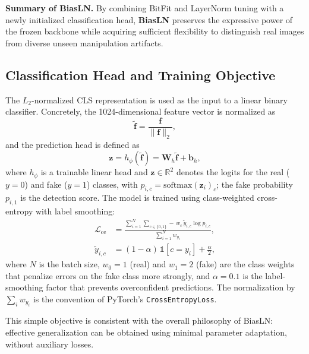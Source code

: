 \documentclass[fonts]{icst}
\newif\ifrevmark\revmarkfalse
\newcommand{\rev}[1]{\ifrevmark{\color{revblue}#1}\else#1\fi}
\begin{document}
\vspace{0.5em}
\noindent \textbf{Summary of BiasLN.}
By combining BitFit and LayerNorm tuning with a newly initialized classification head, \textbf{BiasLN} preserves the expressive power of the frozen backbone while acquiring sufficient flexibility to distinguish real images from diverse unseen manipulation artifacts.

\subsection{Classification Head and Training Objective}

The $L_2$-normalized CLS representation is used as the input to a linear binary classifier.
Concretely, the 1024-dimensional feature vector is normalized as
\begin{equation}
\tilde{\mathbf{f}} = \frac{\mathbf{f}}{\lVert \mathbf{f} \rVert_2},
\end{equation}
and the prediction head is defined as
\begin{equation}
\rev{\mathbf{z} = h_{\phi}(\tilde{\mathbf{f}}) = \mathbf{W}_h\tilde{\mathbf{f}}+\mathbf{b}_h,}
\end{equation}
where $h_{\phi}$ is a trainable linear head and \rev{$\mathbf{z} \in \mathbb{R}^2$ denotes the logits for the real ($y=0$) and fake ($y=1$) classes, with $p_{i,c}=\mathrm{softmax}(\mathbf{z}_i)_c$; the fake probability $p_{i,1}$ is the detection score.}
The model is trained using class-weighted cross-entropy with label smoothing:
\begin{equation}
\rev{\begin{aligned}
\mathcal{L}_{\mathrm{ce}}&=\frac{\sum_{i=1}^{N}\sum_{c\in\{0,1\}}-\,w_c\,\tilde{y}_{i,c}\log p_{i,c}}{\sum_{i=1}^{N}w_{y_i}},\\
\tilde{y}_{i,c}&=(1-\alpha)\,\mathbb{1}[c=y_i]+\tfrac{\alpha}{2},
\end{aligned}}
\label{eq:ce}
\end{equation}
\rev{where $N$ is the batch size, $w_0=1$ (real) and $w_1=2$ (fake) are the class weights that penalize errors on the fake class more strongly, and $\alpha=0.1$ is the label-smoothing factor that prevents overconfident predictions. The normalization by $\sum_i w_{y_i}$ is the convention of PyTorch's \texttt{CrossEntropyLoss}.}

This simple objective is consistent with the overall philosophy of BiasLN: effective generalization can be obtained using minimal parameter adaptation\rev{, without auxiliary losses}.
\end{document}
